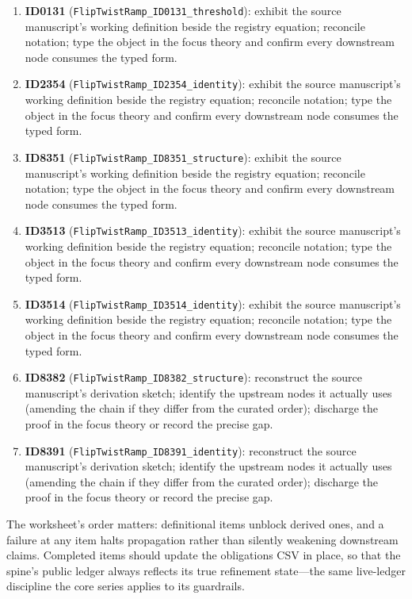 \documentclass[11pt]{article}
\theoremstyle{remark}
\begin{document}
\begin{enumerate}
\item \textbf{ID0131} (\texttt{FlipTwistRamp\_ID0131\_threshold}): exhibit the source manuscript's working definition beside the registry equation; reconcile notation; type the object in the focus theory and confirm every downstream node consumes the typed form.
\item \textbf{ID2354} (\texttt{FlipTwistRamp\_ID2354\_identity}): exhibit the source manuscript's working definition beside the registry equation; reconcile notation; type the object in the focus theory and confirm every downstream node consumes the typed form.
\item \textbf{ID8351} (\texttt{FlipTwistRamp\_ID8351\_structure}): exhibit the source manuscript's working definition beside the registry equation; reconcile notation; type the object in the focus theory and confirm every downstream node consumes the typed form.
\item \textbf{ID3513} (\texttt{FlipTwistRamp\_ID3513\_identity}): exhibit the source manuscript's working definition beside the registry equation; reconcile notation; type the object in the focus theory and confirm every downstream node consumes the typed form.
\item \textbf{ID3514} (\texttt{FlipTwistRamp\_ID3514\_identity}): exhibit the source manuscript's working definition beside the registry equation; reconcile notation; type the object in the focus theory and confirm every downstream node consumes the typed form.
\item \textbf{ID8382} (\texttt{FlipTwistRamp\_ID8382\_structure}): reconstruct the source manuscript's derivation sketch; identify the upstream nodes it actually uses (amending the chain if they differ from the curated order); discharge the proof in the focus theory or record the precise gap.
\item \textbf{ID8391} (\texttt{FlipTwistRamp\_ID8391\_identity}): reconstruct the source manuscript's derivation sketch; identify the upstream nodes it actually uses (amending the chain if they differ from the curated order); discharge the proof in the focus theory or record the precise gap.
\end{enumerate}

The worksheet's order matters: definitional items unblock derived ones, and a failure at any item halts propagation rather than silently weakening downstream claims. Completed items should update the obligations CSV in place, so that the spine's public ledger always reflects its true refinement state---the same live-ledger discipline the core series applies to its guardrails.
\end{document}
